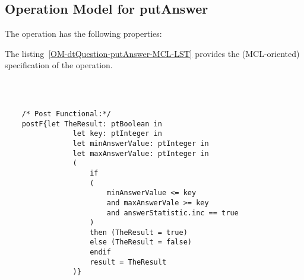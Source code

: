 \subsection{Operation Model for putAnswer}

\label{OM-putAnswer}


The  operation has the following properties:

	\begin{operationmodel}



		


	\end{operationmodel}



	\vspace{1cm}
	The listing~\ref{OM-dtQuestion-putAnswer-MCL-LST} provides the \msrmessir (MCL-oriented) specification of the operation.
	
	\scriptsize
	\vspace{0.5cm}
	\begin{lstlisting}[style=MessirStyle,firstnumber=auto,captionpos=b,caption={\msrmessir (MCL-oriented) specification of the operation \emph{putAnswer}.},label=OM-dtQuestion-putAnswer-MCL-LST]

	
	
	/* Post Functional:*/ 
	postF{let TheResult: ptBoolean in
				let key: ptInteger in
				let minAnswerValue: ptInteger in
				let maxAnswerValue: ptInteger in
				(
					if 
					(
						minAnswerValue <= key
						and maxAnswerVale >= key
						and answerStatistic.inc == true
					)
					then (TheResult = true)
			        else (TheResult = false)
			        endif
			        result = TheResult
				)}
	
	
	\end{lstlisting}
	\normalsize 
	
	
	
	





